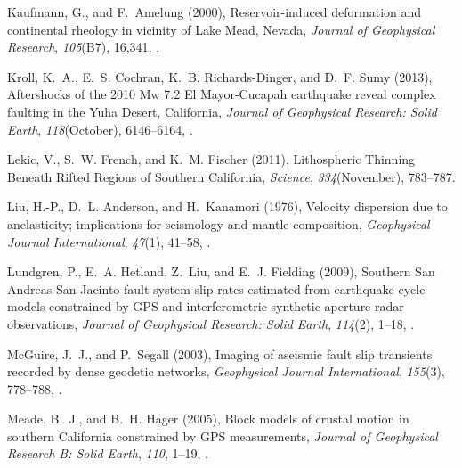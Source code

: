 \documentclass[draft,linenumbers]{AGUJournal}
\begin{document}
\begin{thebibliography}{52}
Kaufmann, G., and F.~Amelung (2000), {Reservoir-induced deformation and
  continental rheology in vicinity of Lake Mead, Nevada}, \textit{Journal of
  Geophysical Research}, \textit{105}(B7), 16,341, .

Kroll, K.~A., E.~S. Cochran, K.~B. Richards-Dinger, and D.~F. Sumy (2013),
  {Aftershocks of the 2010 Mw 7.2 El Mayor-Cucapah earthquake reveal complex
  faulting in the Yuha Desert, California}, \textit{Journal of Geophysical
  Research: Solid Earth}, \textit{118}(October), 6146--6164,
  .

Lekic, V., S.~W. French, and K.~M. Fischer (2011), {Lithospheric Thinning
  Beneath Rifted Regions of Southern California}, \textit{Science},
  \textit{334}(November), 783--787.

Liu, H.-P., D.~L. Anderson, and H.~Kanamori (1976), {Velocity dispersion due to
  anelasticity; implications for seismology and mantle composition},
  \textit{Geophysical Journal International}, \textit{47}(1), 41--58,
  .

Lundgren, P., E.~A. Hetland, Z.~Liu, and E.~J. Fielding (2009), {Southern San
  Andreas-San Jacinto fault system slip rates estimated from earthquake cycle
  models constrained by GPS and interferometric synthetic aperture radar
  observations}, \textit{Journal of Geophysical Research: Solid Earth},
  \textit{114}(2), 1--18, .

McGuire, J.~J., and P.~Segall (2003), {Imaging of aseismic fault slip
  transients recorded by dense geodetic networks}, \textit{Geophysical Journal
  International}, \textit{155}(3), 778--788,
  .

Meade, B.~J., and B.~H. Hager (2005), {Block models of crustal motion in
  southern California constrained by GPS measurements}, \textit{Journal of
  Geophysical Research B: Solid Earth}, \textit{110}, 1--19,
  .


\end{thebibliography}
\end{document}
